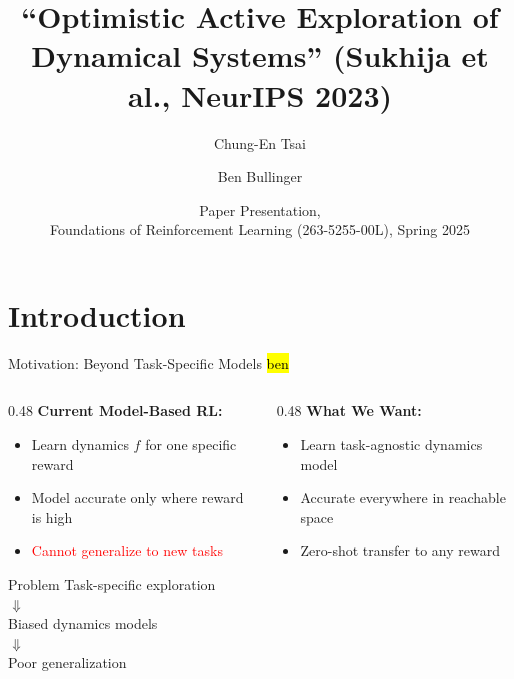 \documentclass[11pt,aspectratio=169]{beamer}
\title{``Optimistic Active Exploration of Dynamical Systems'' \small{(Sukhija et al., NeurIPS 2023)}}
\author{Chung-En Tsai \and Ben Bullinger\vspace{0.01in}} %
\institute{ETH Zürich \\ Department of Computer Science}
\date[Foundations of Reinforcement Learning (263-5255-00L), Spring 2025]{Paper Presentation,\vspace{0.01in} \\ Foundations of Reinforcement Learning (263-5255-00L), Spring 2025} %
\begin{document}
\def\titlefigure{elements/title-page-image}  %
\setlength{\titleboxwidth}{0.85\textwidth} %
\titleframe %

\tocframe %

\section{Introduction}

\begin{frame}{Motivation: Beyond Task-Specific Models \hl{ben}}
    \begin{columns}[T]
        \begin{column}{0.48\textwidth}
            \textbf{Current Model-Based RL:}
            \begin{itemize}
                \item Learn dynamics $f$ for \alert{one specific reward}
                \item Model accurate only where reward is high
                \item \textcolor{red}{Cannot generalize to new tasks}
            \end{itemize}
            \vspace{0.5em}
            \pause
            \begin{block}{Problem}
                \centering
                Task-specific exploration \\
                $\Downarrow$ \\
                Biased dynamics models \\
                $\Downarrow$ \\
                Poor generalization
            \end{block}
        \end{column}
        \pause
        \begin{column}{0.48\textwidth}
            \textbf{What We Want:}
            \begin{itemize}
                \item Learn \alert{task-agnostic} dynamics model
                \item Accurate \alert{everywhere} in reachable space
                \item \textcolor{ETHGreen}{Zero-shot transfer to any reward}

\end{itemize}
\end{column}
\end{columns}
\end{frame}
\end{document}
